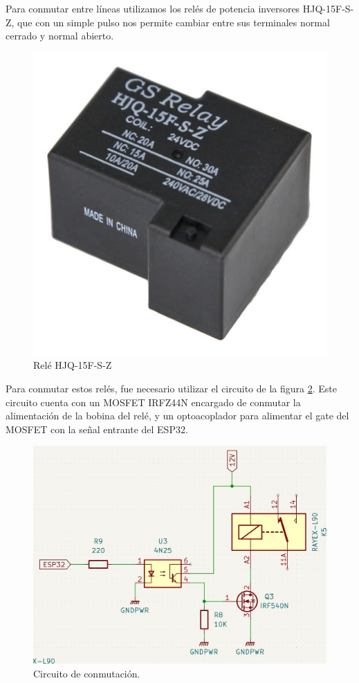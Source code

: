Para conmutar entre líneas utilizamos los relés de potencia inversores HJQ-15F-S-Z, que con un simple pulso nos permite cambiar entre sus terminales normal cerrado y normal abierto.\\

\begin{figure}[H]
    \centering
    \includegraphics[width=0.4\linewidth]{hardware/Rele.jpg}
    \caption{Relé HJQ-15F-S-Z}
    \label{fig:rele}
\end{figure}

Para conmutar estos relés, fue necesario utilizar el circuito de la figura \ref{fig:opto-mosfet-rele}. Este circuito cuenta con un MOSFET IRFZ44N encargado de conmutar la alimentación de la bobina del relé, y un optoacoplador para alimentar el gate del MOSFET con la señal entrante del ESP32. \\

\begin{figure}[H]
    \centering
    \includegraphics[width=0.9\linewidth]{hardware/Screenshot_19.jpg}
    \caption{Circuito de conmutación.}
    \label{fig:opto-mosfet-rele}
\end{figure}

